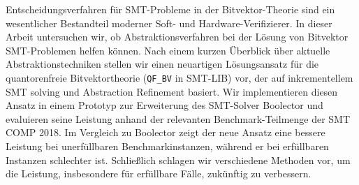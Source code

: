 
\Abstract
Entscheidungsverfahren für SMT-Probleme in der Bitvektor-Theorie sind ein wesentlicher Bestandteil moderner Soft- und Hardware-Verifizierer.
In dieser Arbeit untersuchen wir, ob Abstraktionsverfahren bei der Lösung von Bitvektor SMT-Problemen helfen können.
Nach einem kurzen Überblick über aktuelle Abstraktionstechniken stellen wir einen neuartigen Lösungsansatz für die quantorenfreie Bitvektortheorie (\texttt{QF\_BV} in SMT-LIB) vor, der auf inkrementellem SMT solving und Abstraction Refinement basiert.
Wir implementieren diesen Ansatz in einem Prototyp zur Erweiterung des SMT-Solver Boolector und evaluieren seine Leistung anhand der relevanten Benchmark-Teilmenge der SMT COMP 2018.
Im Vergleich zu Boolector zeigt der neue Ansatz eine bessere Leistung bei unerfüllbaren Benchmarkinstanzen, während er bei erfüllbaren Instanzen schlechter ist.
Schließlich schlagen wir verschiedene Methoden vor, um die Leistung, insbesondere für erfüllbare Fälle, zukünftig zu verbessern.